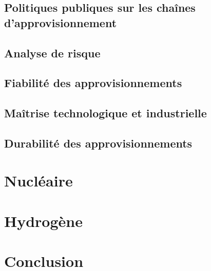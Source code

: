 \documentclass{article}
\begin{document}
\begin{refsection}
\section{Politiques publiques sur les chaînes d'approvisionnement}
\label{section:politiques_publiques}

\subsection{Analyse de risque}
\label{section:analyse_risque}

\subsection{Fiabilité des approvisionnements}
\label{section:fiabilite_appro}

\subsection{Maîtrise technologique et industrielle}
\label{section:maitrise_techno}

\subsection{Durabilité des approvisionnements}
\label{section:durabilite_appro}

\clearpage
\clearpage
\printbibliography
\clearpage
\end{refsection}
\newpage
\begin{refsection}
\section{Nucléaire}
\label{section:nucleaire}

\newpage
\section{Hydrogène}
\label{section:hydrogene}

\clearpage
\printbibliography
\end{refsection}
\clearpage
\section*{Conclusion}

\end{document}
